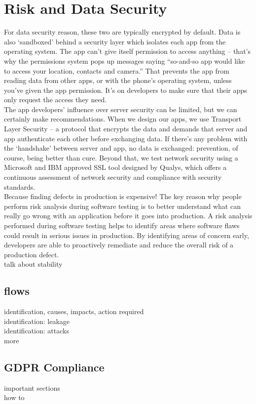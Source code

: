 \section{Risk and Data Security}
For data security reason, these two are typically encrypted by default. Data is also ‘sandboxed’ behind a security layer which isolates each app from the operating system. The app can’t give itself permission to access anything – that’s why the permissions system pops up messages saying “so-and-so app would like to access your location, contacts and camera.” That prevents the app from reading data from other apps, or with the phone’s operating system, unless you’ve given the app permission. It’s on developers to make sure that their apps only request the access they need.
\\The app developers’ influence over server security can be limited, but we can certainly make recommendations. When we design our apps, we use Transport Layer Security – a protocol that encrypts the data and demands that server and app authenticate each other before exchanging data. If there’s any problem with the ‘handshake’ between server and app, no data is exchanged: prevention, of course, being better than cure. Beyond that, we test network security using a Microsoft and IBM approved SSL tool designed by Qualys, which offers a continuous assessment of network security and compliance with security standards.
\\Because finding defects in production is expensive! The key reason why people perform risk analysis during software testing is to better understand what can really go wrong with an application before it goes into production. A risk analysis performed during software testing helps to identify areas where software flaws could result in serious issues in production. By identifying areas of concern early, developers are able to proactively remediate and reduce the overall risk of a production defect.
\\ talk about stability 

\subsection {flows}
identification, causes, impacts, action required
\\ identification: leakage
\\ identification: attacks 
\\ more

\subsection {GDPR Compliance} 
important sections
\\ how to
